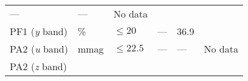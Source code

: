 \begin{longtable}[]{@{}llllll@{}}
\begin{minipage}[t]{0.17\columnwidth}
---\strut
\end{minipage} & \begin{minipage}[t]{0.12\columnwidth}\raggedright\strut
---\strut
\end{minipage} & \begin{minipage}[t]{0.17\columnwidth}\raggedright\strut
No data\strut
\end{minipage}\tabularnewline
\begin{minipage}[t]{0.14\columnwidth}\raggedright\strut
PF1 (\emph{y} band)\strut
\end{minipage} & \begin{minipage}[t]{0.06\columnwidth}\raggedright\strut
\%\strut
\end{minipage} & \begin{minipage}[t]{0.17\columnwidth}\raggedright\strut
\(\leq 20\)\strut
\end{minipage} & \begin{minipage}[t]{0.17\columnwidth}\raggedright\strut
---\strut
\end{minipage} & \begin{minipage}[t]{0.12\columnwidth}\raggedright\strut
36.9\strut
\end{minipage} & \begin{minipage}[t]{0.17\columnwidth}\raggedright\strut
\strut
\end{minipage}\tabularnewline
\begin{minipage}[t]{0.14\columnwidth}\raggedright\strut
PA2 (\emph{u} band)\strut
\end{minipage} & \begin{minipage}[t]{0.06\columnwidth}\raggedright\strut
mmag\strut
\end{minipage} & \begin{minipage}[t]{0.17\columnwidth}\raggedright\strut
\(\leq 22.5\)\strut
\end{minipage} & \begin{minipage}[t]{0.17\columnwidth}\raggedright\strut
---\strut
\end{minipage} & \begin{minipage}[t]{0.12\columnwidth}\raggedright\strut
---\strut
\end{minipage} & \begin{minipage}[t]{0.17\columnwidth}\raggedright\strut
No data\strut
\end{minipage}\tabularnewline
\begin{minipage}[t]{0.14\columnwidth}\raggedright\strut
PA2 (\emph{z} band)\strut
\end{minipage} & \begin{minipage}[t]{0.06\columnwidth}\raggedright\strut

\end{minipage}
\end{longtable}

